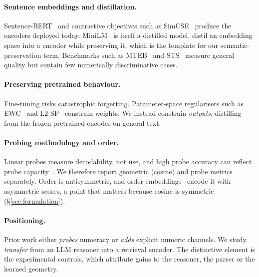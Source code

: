 \documentclass[11pt]{article}
\begin{document}
\paragraph{Sentence embeddings and distillation.} Sentence-BERT~\cite{reimers2019sbert} and contrastive objectives such
as SimCSE~\cite{gao2021simcse} produce the encoders deployed today. MiniLM~\cite{wang2020minilm} is itself a distilled
model. \citet{reimers2020multilingual} distil an embedding space into a encoder while preserving it, which is the
template for our semantic-preservation term. Benchmarks such as MTEB~\cite{muennighoff2023mteb} and STS~\cite{cer2017sts}
measure general quality but contain few numerically discriminative cases.

\paragraph{Preserving pretrained behaviour.} Fine-tuning risks catastrophic forgetting. Parameter-space
regularisers such as EWC~\cite{kirkpatrick2017ewc} and L2-SP~\cite{li2018l2sp} constrain weights. We instead constrain
\emph{outputs}, distilling from the frozen pretrained encoder on general text.

\paragraph{Probing methodology and order.} Linear probes measure decodability, not use, and high probe accuracy can
reflect probe capacity~\cite{hewitt2019control}. We therefore report geometric (cosine) and probe metrics separately.
Order is antisymmetric, and order embeddings~\cite{vendrov2016order} encode it with asymmetric scores, a point that
matters because cosine is symmetric (\S\ref{sec:formulation}).

\paragraph{Positioning.} Prior work either \emph{probes} numeracy or \emph{adds} explicit numeric channels. We study
\emph{transfer} from an LLM reasoner into a retrieval encoder. The distinctive element is the experimental controls,
which attribute gains to the reasoner, the parser or the learned geometry.

\end{document}
